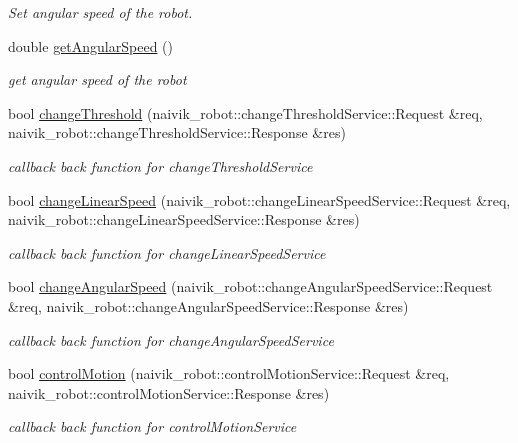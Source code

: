\begin{DoxyCompactItemize}
\begin{DoxyCompactList}\small\item\em Set angular speed of the robot. \end{DoxyCompactList}\item 
double \hyperlink{classMotionController_a814dbc703d2dd1bc125f1eeec77ee397}{get\+Angular\+Speed} ()
\begin{DoxyCompactList}\small\item\em get angular speed of the robot \end{DoxyCompactList}\item 
bool \hyperlink{classMotionController_aa30d05fe1ac02a747b21ef8b111d57b6}{change\+Threshold} (naivik\+\_\+robot\+::change\+Threshold\+Service\+::\+Request \&req, naivik\+\_\+robot\+::change\+Threshold\+Service\+::\+Response \&res)
\begin{DoxyCompactList}\small\item\em callback back function for change\+Threshold\+Service \end{DoxyCompactList}\item 
bool \hyperlink{classMotionController_a9904a43514341564366deaecb477e876}{change\+Linear\+Speed} (naivik\+\_\+robot\+::change\+Linear\+Speed\+Service\+::\+Request \&req, naivik\+\_\+robot\+::change\+Linear\+Speed\+Service\+::\+Response \&res)
\begin{DoxyCompactList}\small\item\em callback back function for change\+Linear\+Speed\+Service \end{DoxyCompactList}\item 
bool \hyperlink{classMotionController_ac516d9c9888ec43dc5f631361e795098}{change\+Angular\+Speed} (naivik\+\_\+robot\+::change\+Angular\+Speed\+Service\+::\+Request \&req, naivik\+\_\+robot\+::change\+Angular\+Speed\+Service\+::\+Response \&res)
\begin{DoxyCompactList}\small\item\em callback back function for change\+Angular\+Speed\+Service \end{DoxyCompactList}\item 
bool \hyperlink{classMotionController_a723c2b7d67caf7f44b0f26d319f991b5}{control\+Motion} (naivik\+\_\+robot\+::control\+Motion\+Service\+::\+Request \&req, naivik\+\_\+robot\+::control\+Motion\+Service\+::\+Response \&res)
\begin{DoxyCompactList}\small\item\em callback back function for control\+Motion\+Service \end{DoxyCompactList}\end{DoxyCompactItemize}
